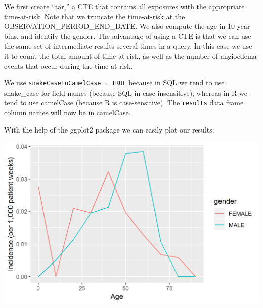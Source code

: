 \documentclass[11pt]{book}
\newenvironment{Shaded}{\begin{snugshade}}{\end{snugshade}}
\newcommand{\KeywordTok}[1]{\textcolor[rgb]{0.13,0.29,0.53}{\textbf{#1}}}
\newcommand{\DataTypeTok}[1]{\textcolor[rgb]{0.13,0.29,0.53}{#1}}
\newcommand{\DecValTok}[1]{\textcolor[rgb]{0.00,0.00,0.81}{#1}}
\newcommand{\StringTok}[1]{\textcolor[rgb]{0.31,0.60,0.02}{#1}}
\newcommand{\CommentTok}[1]{\textcolor[rgb]{0.56,0.35,0.01}{\textit{#1}}}
\newcommand{\OperatorTok}[1]{\textcolor[rgb]{0.81,0.36,0.00}{\textbf{#1}}}
\newcommand{\NormalTok}[1]{#1}
\theoremstyle{definition}
\theoremstyle{definition}
\theoremstyle{definition}
\theoremstyle{remark}
\begin{document}
We first create ``tar,'' a CTE that contains all exposures with the
appropriate time-at-risk. Note that we truncate the time-at-risk at the
OBSERVATION\_PERIOD\_END\_DATE. We also compute the age in 10-year bins,
and identify the gender. The advantage of using a CTE is that we can use
the same set of intermediate results several times in a query. In this
case we use it to count the total amount of time-at-risk, as well as the
number of angioedema events that occur during the time-at-risk.

We use \texttt{snakeCaseToCamelCase\ =\ TRUE} because in SQL we tend to
use snake\_case for field names (because SQL in case-insensitive),
whereas in R we tend to use camelCase (because R is case-sensitive). The
\texttt{results} data frame column names will now be in camelCase.

With the help of the ggplot2 package we can easily plot our results:

\begin{Shaded}
\end{Shaded}

\begin{center}\includegraphics[width=0.8\linewidth]{images/SqlAndR/ir} \end{center}
\end{document}
